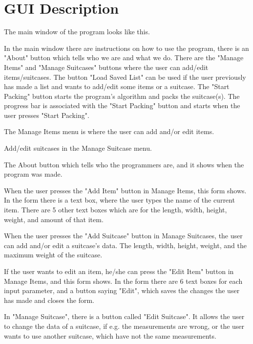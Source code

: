 \section{GUI Description}

The main window of the program looks like this.


In the main window there are instructions on how to use the program, there is an "About" button which tells who we are and what we do. There are the "Manage Items" and "Manage Suitcases" buttons where the user can add/edit items/suitcases. The button "Load Saved List" can be used if the user previously has made a list and wants to add/edit some items or a suitcase. The "Start Packing" button starts the program's algorithm and packs the suitcase(s). The progress bar is associated with the "Start Packing" button and starts when the user presses "Start Packing".

The Manage Items menu is where the user can add and/or edit items.

Add/edit suitcases in the Manage Suitcase menu.

The About button which tells who the programmers are, and it shows when the program was made.

When the user presses the "Add Item" button in Manage Items, this form shows. In the form there is a text box, where the user types the name of the current item. There are 5 other text boxes which are for the length, width, height, weight, and amount of that item.

When the user presses the "Add Suitcase" button in Manage Suitcases, the user can add and/or edit a suitcase's data. The length, width, height, weight, and the maximum weight of the suitcase. 

If the user wants to edit an item, he/she can press the "Edit Item" button in Manage Items, and this form shows. In the form there are 6 text boxes for each input parameter, and a button saying "Edit", which saves the changes the user has made and closes the form.

In "Manage Suitcase", there is a button called "Edit Suitcase". It allows the user to change the data of a suitcase, if e.g. the measurements are wrong, or the user wants to use another suitcase, which have not the same measurements.

